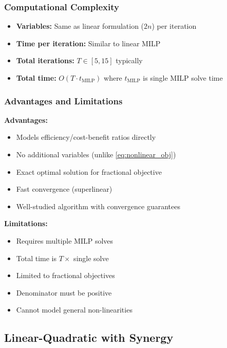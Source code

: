 \documentclass{article}
\begin{document}
\subsubsection{Computational Complexity}

\begin{itemize}
    \item \textbf{Variables:} Same as linear formulation ($2n$) per iteration
    \item \textbf{Time per iteration:} Similar to linear MILP
    \item \textbf{Total iterations:} $T \in [5, 15]$ typically
    \item \textbf{Total time:} $O(T \cdot t_{\text{MILP}})$ where $t_{\text{MILP}}$ is single MILP solve time
\end{itemize}

\newpage
\subsubsection{Advantages and Limitations}

\begin{multicols}{2}
\textbf{Advantages:}
\begin{itemize}
    \item Models efficiency/cost-benefit ratios directly
    \item No additional variables (unlike \ref{eq:nonlinear_obj})
    \item Exact optimal solution for fractional objective
    \item Fast convergence (superlinear)
    \item Well-studied algorithm with convergence guarantees
\end{itemize}
\columnbreak
\textbf{Limitations:}
\begin{itemize}
    \item Requires multiple MILP solves
    \item Total time is $T \times$ single solve
    \item Limited to fractional objectives
    \item Denominator must be positive
    \item Cannot model general non-linearities
\end{itemize}
\end{multicols}

\newpage


\subsection{Linear-Quadratic with Synergy}
\end{document}
